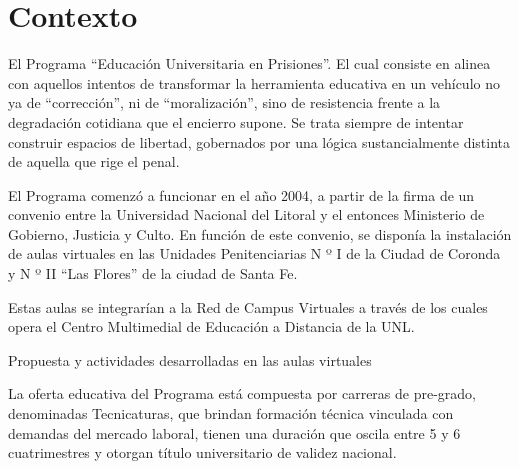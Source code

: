 \chapter{Contexto}\label{cap:contexto}

    El Programa “Educación Universitaria en Prisiones”.
    El cual consiste en alinea con aquellos intentos de transformar la herramienta educativa
    en un vehículo no ya de “corrección”, ni de “moralización”, sino de resistencia frente
    a la degradación cotidiana que el encierro supone. Se trata siempre de 
    intentar construir espacios de libertad, gobernados por una lógica sustancialmente 
    distinta de aquella que rige el penal.\par
    El Programa comenzó a funcionar en el año 2004, a partir de la firma de un convenio
    entre la Universidad Nacional del Litoral y el entonces Ministerio de Gobierno, 
    Justicia y Culto. En función de este convenio, se disponía la instalación de 
    aulas virtuales en las Unidades Penitenciarias N º I de la Ciudad de Coronda y 
    N º II “Las Flores” de la ciudad de Santa Fe.\par
    Estas aulas se integrarían a la Red de Campus Virtuales a través de los cuales 
    opera el Centro Multimedial de Educación a Distancia de la UNL.\par

    \vspace{0,5cm}

    \begin{center}

        Propuesta y actividades desarrolladas en las aulas virtuales

    \end{center}

    \vspace{0.2cm}


    La oferta educativa del Programa está compuesta por carreras de pre-grado, denominadas
    Tecnicaturas, que brindan formación técnica vinculada con demandas del mercado laboral,
    tienen una duración que oscila entre 5 y 6 cuatrimestres y otorgan título universitario de
    validez nacional.

